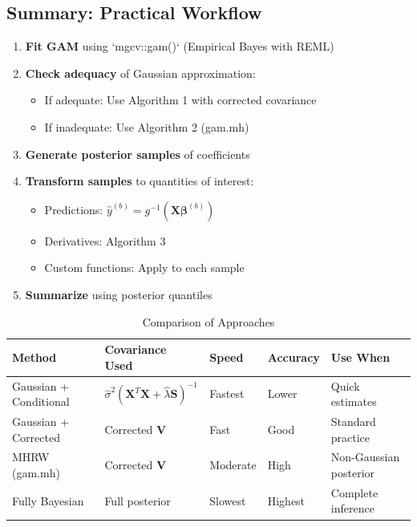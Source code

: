 \documentclass[12pt]{article}
\begin{document}
\subsection{Summary: Practical Workflow}

\begin{enumerate}
    \item \textbf{Fit GAM} using `mgcv::gam()` (Empirical Bayes with REML)
    \item \textbf{Check adequacy} of Gaussian approximation:
    \begin{itemize}
        \item If adequate: Use Algorithm 1 with corrected covariance
        \item If inadequate: Use Algorithm 2 (gam.mh)
    \end{itemize}
    \item \textbf{Generate posterior samples} of coefficients
    \item \textbf{Transform samples} to quantities of interest:
    \begin{itemize}
        \item Predictions: $\hat{y}^{(b)} = g^{-1}(\mathbf{X}\boldsymbol{\beta}^{(b)})$
        \item Derivatives: Algorithm 3
        \item Custom functions: Apply to each sample
    \end{itemize}
    \item \textbf{Summarize} using posterior quantiles
\end{enumerate}

\begin{table}[h]
\centering
\caption{Comparison of Approaches}
\begin{tabular}{lllll}
\toprule
\textbf{Method} & \textbf{Covariance Used} & \textbf{Speed} & \textbf{Accuracy} & \textbf{Use When} \\
\midrule
Gaussian + Conditional & $\hat{\sigma}^2(\mathbf{X}^T\mathbf{X} + \hat{\lambda}\mathbf{S})^{-1}$ & Fastest & Lower & Quick estimates \\
Gaussian + Corrected & Corrected $\mathbf{V}$ & Fast & Good & Standard practice \\
MHRW (gam.mh) & Corrected $\mathbf{V}$ & Moderate & High & Non-Gaussian posterior \\
Fully Bayesian & Full posterior & Slowest & Highest & Complete inference \\
\bottomrule
\end{tabular}
\end{table}
\end{document}

